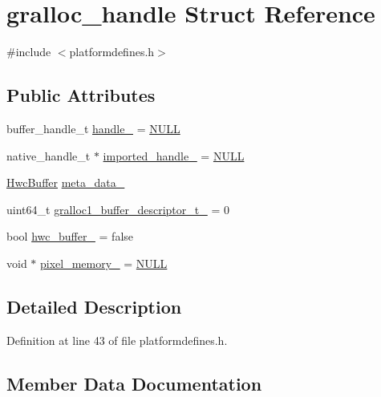 \hypertarget{structgralloc__handle}{}\section{gralloc\+\_\+handle Struct Reference}
\label{structgralloc__handle}


{\ttfamily \#include $<$platformdefines.\+h$>$}

\subsection*{Public Attributes}
\begin{DoxyCompactItemize}
\item 
buffer\+\_\+handle\+\_\+t \mbox{\hyperlink{structgralloc__handle_a7ab2601be21b021ab2a14d6549c6a537}{handle\+\_\+}} = \mbox{\hyperlink{alios_2platformdefines_8h_a070d2ce7b6bb7e5c05602aa8c308d0c4}{N\+U\+LL}}
\item 
native\+\_\+handle\+\_\+t $\ast$ \mbox{\hyperlink{structgralloc__handle_a6164b11702467313a0276cd7f823696a}{imported\+\_\+handle\+\_\+}} = \mbox{\hyperlink{alios_2platformdefines_8h_a070d2ce7b6bb7e5c05602aa8c308d0c4}{N\+U\+LL}}
\item 
\mbox{\hyperlink{structHwcBuffer}{Hwc\+Buffer}} \mbox{\hyperlink{structgralloc__handle_aa5c246b4955a8c51868b7915c6d512ab}{meta\+\_\+data\+\_\+}}
\item 
uint64\+\_\+t \mbox{\hyperlink{structgralloc__handle_a3b9885580cfaa575a8e159512e247d9f}{gralloc1\+\_\+buffer\+\_\+descriptor\+\_\+t\+\_\+}} = 0
\item 
bool \mbox{\hyperlink{structgralloc__handle_a3ed360c5ac62fea5f6e171371ba6bb2a}{hwc\+\_\+buffer\+\_\+}} = false
\item 
void $\ast$ \mbox{\hyperlink{structgralloc__handle_a23cae3e928fd07aced2f0c3f3690b9f9}{pixel\+\_\+memory\+\_\+}} = \mbox{\hyperlink{alios_2platformdefines_8h_a070d2ce7b6bb7e5c05602aa8c308d0c4}{N\+U\+LL}}
\end{DoxyCompactItemize}


\subsection{Detailed Description}


Definition at line 43 of file platformdefines.\+h.



\subsection{Member Data Documentation}
\mbox{\label{structgralloc__handle_a3b9885580cfaa575a8e159512e247d9f}} 
